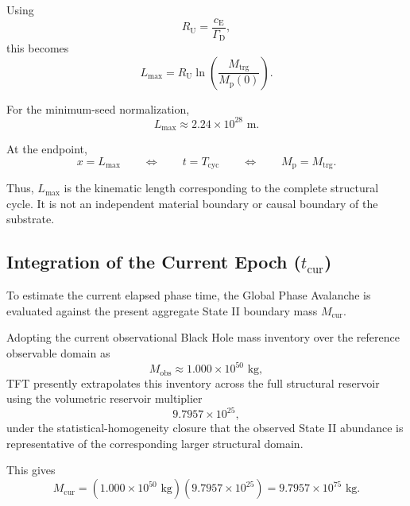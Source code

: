 Using
\begin{equation}
    R_{\mathrm{U}}
    =
    \frac{c_{\mathrm{E}}}{\Gamma_{\mathrm{D}}},
\end{equation}
this becomes
\begin{equation}
    L_{\mathrm{max}}
    =
    R_{\mathrm{U}}
    \ln\left(
        \frac{M_{\mathrm{trg}}}
        {M_{\mathrm{p}}(0)}
    \right).
\end{equation}

For the minimum-seed normalization,
\begin{equation}
    L_{\mathrm{max}}
    \approx
    2.24\times10^{28}
    \text{ m}.
\end{equation}

At the endpoint,
\begin{equation}
    x=L_{\mathrm{max}}
    \qquad\Longleftrightarrow\qquad
    t=T_{\mathrm{cyc}}
    \qquad\Longleftrightarrow\qquad
    M_{\mathrm{p}}=M_{\mathrm{trg}}.
\end{equation}

Thus, $L_{\mathrm{max}}$ is the kinematic length corresponding to the complete structural cycle. It is not an independent material boundary or causal boundary of the substrate.

\subsection{Integration of the Current Epoch ($t_{\mathrm{cur}}$)}

To estimate the current elapsed phase time, the Global Phase Avalanche is evaluated against the present aggregate State II boundary mass $M_{\mathrm{cur}}$.

Adopting the current observational Black Hole mass inventory over the reference observable domain as
\begin{equation}
    M_{\mathrm{obs}}
    \approx
    1.000\times10^{50}
    \text{ kg},
\end{equation}
TFT presently extrapolates this inventory across the full structural reservoir using the volumetric reservoir multiplier
\begin{equation}
    9.7957\times10^{25},
\end{equation}
under the statistical-homogeneity closure that the observed State II abundance is representative of the corresponding larger structural domain.

This gives
\begin{equation}
    M_{\mathrm{cur}}
    =
    \left(
        1.000\times10^{50}
        \text{ kg}
    \right)
    \left(
        9.7957\times10^{25}
    \right)
    =
    9.7957\times10^{75}
    \text{ kg}.
\end{equation}

